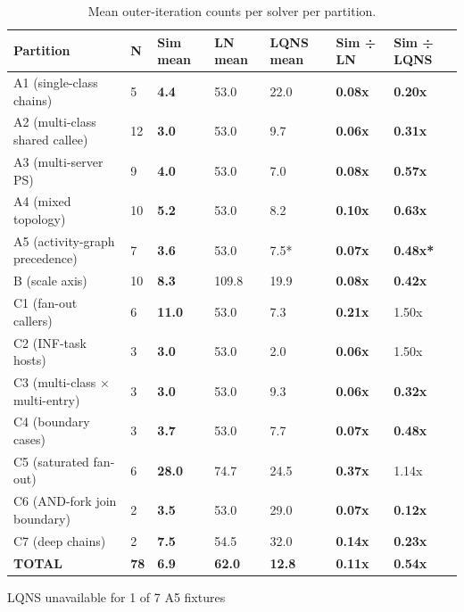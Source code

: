\begin{table}[h] 
\centering 
\footnotesize
\begin{tabular}{|l|l|l|l|l|l|l|}
\hline
Partition & N & Sim mean & LN mean & LQNS mean & Sim ÷ LN & Sim ÷ LQNS \\
\hline
A1 (single-class chains) & 5 & \textbf{4.4} & 53.0 & 22.0 & \textbf{0.08x} & \textbf{0.20x} \\
\hline
A2 (multi-class shared callee) & 12 & \textbf{3.0} & 53.0 & 9.7 & \textbf{0.06x} & \textbf{0.31x} \\
\hline
A3 (multi-server PS) & 9 & \textbf{4.0} & 53.0 & 7.0 & \textbf{0.08x} & \textbf{0.57x} \\
\hline
A4 (mixed topology) & 10 & \textbf{5.2} & 53.0 & 8.2 & \textbf{0.10x} & \textbf{0.63x} \\
\hline
A5 (activity-graph precedence) & 7 & \textbf{3.6} & 53.0 & 7.5* & \textbf{0.07x} & \textbf{0.48x*} \\
\hline
B (scale axis) & 10 & \textbf{8.3} & 109.8 & 19.9 & \textbf{0.08x} & \textbf{0.42x} \\
\hline
C1 (fan-out callers) & 6 & \textbf{11.0} & 53.0 & 7.3 & \textbf{0.21x} & 1.50x \\
\hline
C2 (INF-task hosts) & 3 & \textbf{3.0} & 53.0 & 2.0 & \textbf{0.06x} & 1.50x \\
\hline
C3 (multi-class × multi-entry) & 3 & \textbf{3.0} & 53.0 & 9.3 & \textbf{0.06x} & \textbf{0.32x} \\
\hline
C4 (boundary cases) & 3 & \textbf{3.7} & 53.0 & 7.7 & \textbf{0.07x} & \textbf{0.48x} \\
\hline
C5 (saturated fan-out) & 6 & \textbf{28.0} & 74.7 & 24.5 & \textbf{0.37x} & 1.14x \\
\hline
C6 (AND-fork join boundary) & 2 & \textbf{3.5} & 53.0 & 29.0 & \textbf{0.07x} & \textbf{0.12x} \\
\hline
C7 (deep chains) & 2 & \textbf{7.5} & 54.5 & 32.0 & \textbf{0.14x} & \textbf{0.23x} \\
\hline
\textbf{TOTAL} & \textbf{78} & \textbf{6.9} & \textbf{62.0} & \textbf{12.8} & \textbf{0.11x} & \textbf{0.54x} \\
\hline
\end{tabular}
{\footnotesize *LQNS unavailable for 1 of 7 A5 fixtures}
\caption{Mean outer-iteration counts per solver per partition.}
\label{tab:eval-iter-counts-per-partition}
\end{table}

